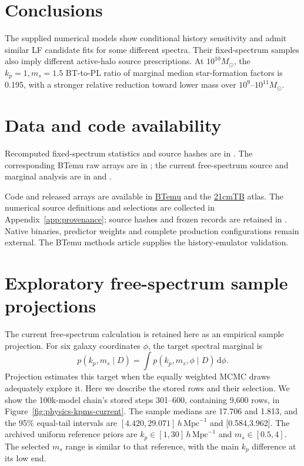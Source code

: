 \section{Conclusions}\label{conclusions}

The supplied numerical models show conditional history sensitivity and admit similar LF candidate fits for some different spectra. Their fixed-spectrum samples also imply different active-halo source prescriptions. At $10^{10}M_\odot$, the $k_p=1,m_s=1.5$ BT-to-PL ratio of marginal median star-formation factors is 0.195, with a stronger relative reduction toward lower mass over $10^9$--$10^{11}M_\odot$.

\section*{Data and code availability}

Recomputed fixed-spectrum statistics and source hashes are in . The corresponding BTemu raw arrays are in ; the current free-spectrum source and marginal analysis are in  and .

Code and released arrays are available in \href{https://github.com/HainaHuang729/BTemu}{BTemu} and the \href{https://github.com/HainaHuang729/21cmTB}{21cmTB} atlas. The numerical source definitions and selections are collected in Appendix~\ref{app:provenance}; source hashes and frozen records are retained in . Native binaries, predictor weights and complete production configurations remain external. The BTemu methods article supplies the history-emulator validation.

\clearpage


\clearpage\appendix
\setcounter{figure}{0}

\section{Exploratory free-spectrum sample projections}\label{app:free-spectrum-exploration}\label{physics-current-inference}

The current free-spectrum calculation is retained here as an empirical sample projection. For six galaxy coordinates $\phi$, the target spectral marginal is
\begin{equation}
p(k_p,m_s\mid D)=\int p(k_p,m_s,\phi\mid D)\,\mathrm d\phi.
\end{equation}
Projection estimates this target when the equally weighted MCMC draws adequately explore it. Here we describe the stored rows and their selection. We show the 100k-model chain's stored steps 301--600, containing 9,600 rows, in Figure~\ref{fig:physics-kpms-current}. The sample medians are 17.706 and 1.813, and the 95\% equal-tail intervals are $[4.420,29.071]\,h\,\mathrm{Mpc}^{-1}$ and [0.584,3.962]. The archived uniform reference priors are $k_p\in[1,30]\,h\,\mathrm{Mpc}^{-1}$ and $m_s\in[0.5,4]$. The selected $m_s$ range is similar to that reference, with the main $k_p$ difference at its low end.

